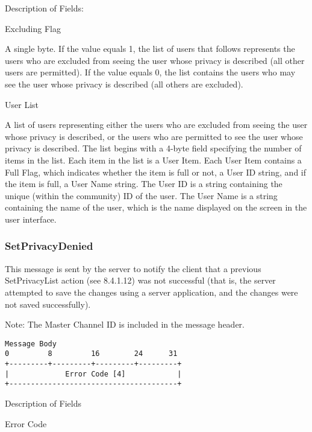 \documentclass[titlepage,oneside]{book}
\begin{document}
\par{} Description of Fields:

\par{} Excluding Flag

\subpar{}  A single byte. If the value equals 1, the list of users that follows
  represents the users who are excluded from seeing the user whose
  privacy is described (all other users are permitted). If the value
  equals 0, the list contains the users who may see the user whose
  privacy is described (all others are excluded).

\par{} User List

\subpar{}  A list of users representing either the users who are excluded from
  seeing the user whose privacy is described, or the users who are
  permitted to see the user whose privacy is described. The list begins
  with a 4-byte field specifying the number of items in the list. Each
  item in the list is a User Item. Each User Item contains a Full Flag,
  which indicates whether the item is full or not, a User ID string,
  and if the item is full, a User Name string. The User ID is a string
  containing the unique (within the community) ID of the user. The User
  Name is a string containing the name of the user, which is the name
  displayed on the screen in the user interface.

\subsubsection{SetPrivacyDenied}

\par{} This message is sent by the server to notify the client that a previous
SetPrivacyList action (see 8.4.1.12) was not successful
(that is, the server attempted to save the changes using a server
application, and the changes were not saved successfully).

\par{} Note: The Master Channel ID is included in the message header.

\begin{verbatim}
Message Body
0         8         16        24      31
+---------+---------+---------+---------+
|             Error Code [4]            |
+---------------------------------------+
\end{verbatim}

\par{} Description of Fields

\par{} Error Code
\end{document}
